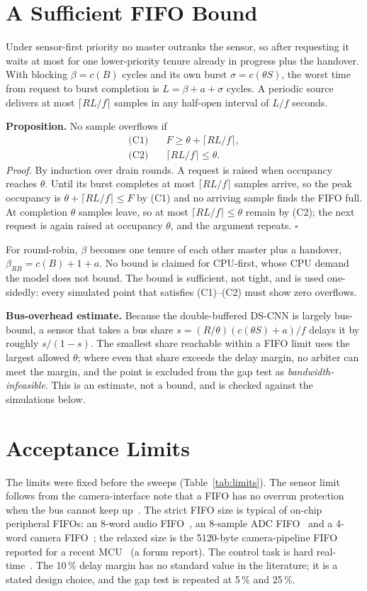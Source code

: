 \documentclass[conference]{IEEEtran}
\begin{document}
\section{A Sufficient FIFO Bound}\label{sec:bound}
Under sensor-first priority no master outranks the sensor, so after requesting it waits at most for one lower-priority tenure already in progress plus the handover. With blocking $\beta = c(B)$ cycles and its own burst $\sigma = c(\theta S)$, the worst time from request to burst completion is $L=\beta+a+\sigma$ cycles. A periodic source delivers at most $\lceil R L/f\rceil$ samples in any half-open interval of $L/f$ seconds.

\textbf{Proposition.} No sample overflows if
\begin{align}
\text{(C1)}\quad & F \ge \theta + \lceil R L / f \rceil, \label{eq:c1}\\
\text{(C2)}\quad & \lceil R L / f \rceil \le \theta. \label{eq:c2}
\end{align}
\emph{Proof.} By induction over drain rounds. A request is raised when occupancy reaches $\theta$. Until its burst completes at most $\lceil RL/f\rceil$ samples arrive, so the peak occupancy is $\theta+\lceil RL/f\rceil\le F$ by (C1) and no arriving sample finds the FIFO full. At completion $\theta$ samples leave, so at most $\lceil RL/f\rceil\le\theta$ remain by (C2); the next request is again raised at occupancy $\theta$, and the argument repeats. $\square$

For round-robin, $\beta$ becomes one tenure of each other master plus a handover, $\beta_{RR}=c(B)+1+a$. No bound is claimed for CPU-first, whose CPU demand the model does not bound. The bound is sufficient, not tight, and is used one-sidedly: every simulated point that satisfies (C1)--(C2) must show zero overflows.

\textbf{Bus-overhead estimate.} Because the double-buffered DS-CNN is largely bus-bound, a sensor that takes a bus share $s=(R/\theta)(c(\theta S)+a)/f$ delays it by roughly $s/(1-s)$. The smallest share reachable within a FIFO limit uses the largest allowed $\theta$; where even that share exceeds the delay margin, no arbiter can meet the margin, and the point is excluded from the gap test as \emph{bandwidth-infeasible}. This is an estimate, not a bound, and is checked against the simulations below.

\section{Acceptance Limits}\label{sec:limits}
The limits were fixed before the sweeps (Table~\ref{tab:limits}). The sensor limit follows from the camera-interface note that a FIFO has no overrun protection when the bus cannot keep up~\cite{an5020}. The strict FIFO size is typical of on-chip peripheral FIFOs: an 8-word audio FIFO~\cite{rm0432}, an 8-sample ADC FIFO~\cite{rp2040} and a 4-word camera FIFO~\cite{an5020}; the relaxed size is the 5120-byte camera-pipeline FIFO reported for a recent MCU~\cite{stforum} (a forum report). The control task is hard real-time~\cite{buttazzo}. The 10\,\% delay margin has no standard value in the literature; it is a stated design choice, and the gap test is repeated at 5\,\% and 25\,\%.
\end{document}
